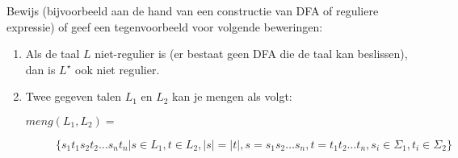 \documentclass{article}
\begin{document}
\begin{question}
Bewijs (bijvoorbeeld aan de hand van een constructie van DFA of
reguliere expressie) of geef een tegenvoorbeeld voor volgende
beweringen:
\begin{enumerate}
\item Als de taal $L$ niet-regulier is (er bestaat geen DFA die de
taal kan beslissen), dan is $L^{\star}$ ook niet regulier.

\item 
Twee gegeven talen $L_1$ en $L_2$ kan je mengen als volgt:

$meng(L_1,L_2) = $

$~~~~~~~~~~~~\{s_1t_1s_2t_2\ldots s_nt_n | s\in L_1,t\in L_2, |s| = |t|,s = s_1s_2\ldots s_n, t = t_1t_2\ldots t_n, s_i \in \Sigma_1, t_i \in \Sigma_2\}$


\end{enumerate}
\end{question}
\end{document}
